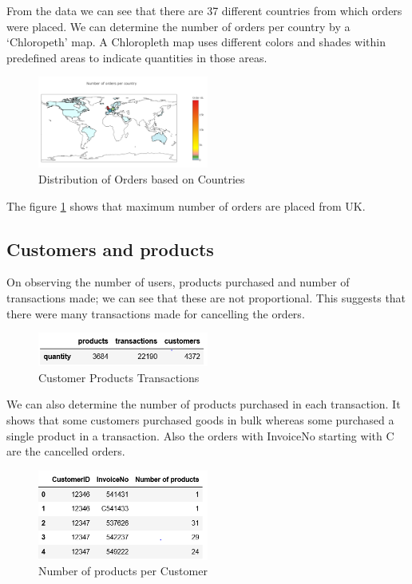 From the data we can see that there are 37 different countries from which orders were placed. We can determine the number of orders per country by a  `Chloropeth' map. A Chloropleth map uses different colors and shades within predefined areas to indicate quantities in those areas. \\

\begin{figure}[H]
\caption{Distribution of Orders based on Countries}
\label{country}
\centering
\includegraphics[width=0.5\textwidth]{images/chloropleth.PNG}
\end{figure}

The figure \ref{country} shows that maximum number of orders are placed from UK.

\subsection{Customers and products}

On observing the number of users, products purchased and number of transactions made; we can see that these are not proportional. This suggests that there were many transactions made for cancelling the orders.\\

\begin{figure}[H]
\caption{Customer Products Transactions}
\label{2.1}
\centering
\includegraphics[width=0.5\textwidth]{images/2_1.PNG}
\end{figure}

We can also determine the number of products purchased in each transaction. It shows that some customers purchased goods in bulk whereas some purchased a single product in a transaction.
Also the orders with InvoiceNo starting with C are the cancelled orders.

\begin{figure}[H]
\caption{Number of products per Customer}
\label{2.2}
\centering
\includegraphics[width=0.5\textwidth]{images/2_2.PNG}
\end{figure}


